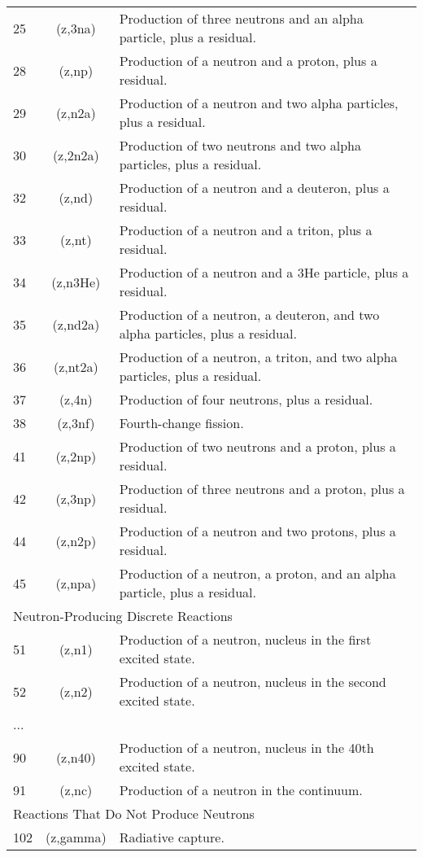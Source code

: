 \begin{table}[h]
\begin{tabular}{| l | c | l |}
25	& (z,3na)	 &    Production of three neutrons and an alpha particle, plus a residual.	\\
28	& (z,np)	 &    Production of a neutron and a proton, plus a residual.	\\
29	& (z,n2a)	 &    Production of a neutron and two alpha particles, plus a residual.	\\
30	& (z,2n2a)	&   Production of two neutrons and two alpha particles, plus a residual.	\\
32	& (z,nd)	 &    Production of a neutron and a deuteron, plus a residual.	\\
33	& (z,nt)	 &    Production of a neutron and a triton, plus a residual.	\\
34	& (z,n3He)	&   Production of a neutron and a 3He particle, plus a residual.	\\
35	& (z,nd2a)	&   Production of a neutron, a deuteron, and two alpha particles, plus a residual.	\\
36	& (z,nt2a)	&   Production of a neutron, a triton, and two alpha particles, plus a residual.	\\
37	& (z,4n)	 &    Production of four neutrons, plus a residual.	\\
38	& (z,3nf)	 &    Fourth-change fission.	\\
41	& (z,2np)	 &    Production of two neutrons and a proton, plus a residual.	\\
42	& (z,3np)	 &    Production of three neutrons and a proton, plus a residual.	\\
44	& (z,n2p)	 &    Production of a neutron and two protons, plus a residual.	\\
45	& (z,npa)	 &    Production of a neutron, a proton, and an alpha particle, plus a residual.	\\
\hline
\multicolumn{3}{l}{ Neutron-Producing Discrete Reactions} \\
\hline
51	& (z,n1)	& Production of a neutron, nucleus in the first excited state.	\\
52	& (z,n2)	& Production of a neutron, nucleus in the second excited state.	\\
... & & \\
90	& (z,n40) &	Production of a neutron, nucleus in the 40th excited state.	\\
91	& (z,nc)	& Production of a neutron in the continuum.	\\
\hline
\multicolumn{3}{l}{Reactions That Do Not Produce Neutrons}\\
\hline
102	& (z,gamma) &	Radiative capture.	\\

\end{tabular}
\end{table}
